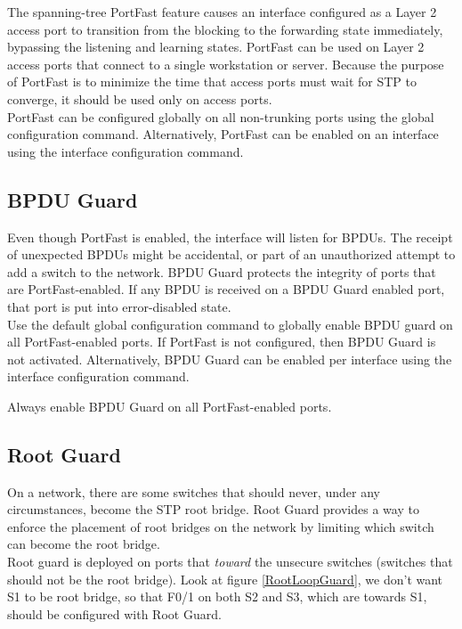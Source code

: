 The spanning-tree PortFast feature causes an interface configured as a Layer 2 access port to transition from the blocking to the forwarding state immediately, bypassing the listening and learning states. PortFast can be used on Layer 2 access ports that connect to a single workstation or server. Because the purpose of PortFast is to minimize the time that access ports must wait for STP to converge, it should be used only on access ports. \\

PortFast can be configured globally on all non-trunking ports using the  global configuration command. Alternatively, PortFast can be enabled on an interface using the  interface configuration command.

\subsection{BPDU Guard}

Even though PortFast is enabled, the interface will listen for BPDUs. The receipt of unexpected BPDUs might be accidental, or part of an unauthorized attempt to add a switch to the network. BPDU Guard protects the integrity of ports that are PortFast-enabled. If any BPDU is received on a BPDU Guard enabled port, that port is put into error-disabled state. \\

Use the  default global configuration command to globally enable BPDU guard on all PortFast-enabled ports. If PortFast is not configured, then BPDU Guard is not activated. Alternatively, BPDU Guard can be enabled per interface using the  interface configuration command.

\note Always enable BPDU Guard on all PortFast-enabled ports.

\subsection{Root Guard}

On a network, there are some switches that should never, under any circumstances, become the STP root bridge. Root Guard provides a way to enforce the placement of root bridges on the network by limiting which switch can become the root bridge. \\

Root guard is deployed on ports that \emph{toward} the unsecure switches (switches that should not be the root bridge). Look at figure \ref{RootLoopGuard}, we don't want S1 to be root bridge, so that F0/1 on both S2 and S3, which are towards S1, should be configured with Root Guard.\\

